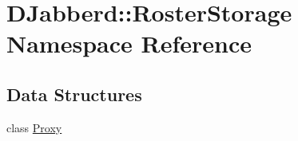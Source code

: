 \hypertarget{namespace_d_jabberd_1_1_roster_storage}{
\section{\-D\-Jabberd\-:\-:\-Roster\-Storage \-Namespace \-Reference}
\label{namespace_d_jabberd_1_1_roster_storage}
}
\subsection*{\-Data \-Structures}
\begin{DoxyCompactItemize}
\item 
class \hyperlink{class_d_jabberd_1_1_roster_storage_1_1_proxy}{\-Proxy}
\end{DoxyCompactItemize}
